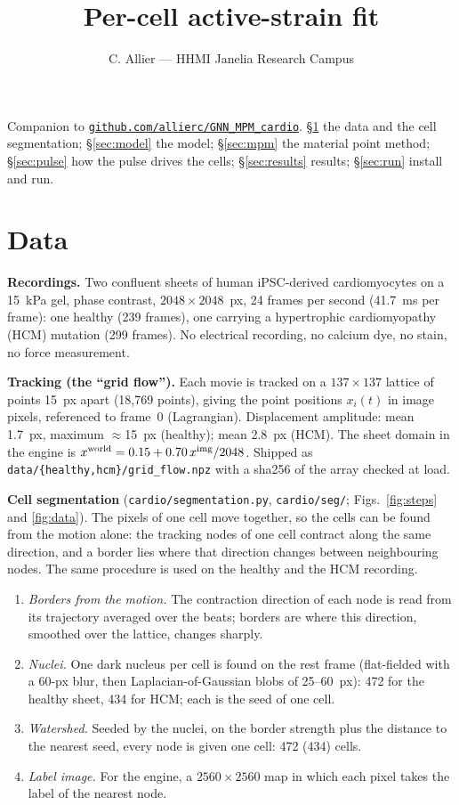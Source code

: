 \documentclass[10pt]{article}
\title{\textbf{Per-cell active-strain fit}}
\author{C. Allier --- HHMI Janelia Research Campus}
\date{}
\newcommand{\code}[1]{\texttt{#1}}
\begin{document}
\maketitle

\noindent Companion to \href{https://github.com/allierc/GNN_MPM_cardio}{\code{github.com/allierc/GNN\_MPM\_cardio}}.
\S\ref{sec:data} the data and the cell segmentation; \S\ref{sec:model} the model; \S\ref{sec:mpm} the material
point method; \S\ref{sec:pulse} how the pulse drives the cells; \S\ref{sec:results} results; \S\ref{sec:run} install and run.

\section{Data}\label{sec:data}

\textbf{Recordings.} Two confluent sheets of human iPSC-derived cardiomyocytes on a 15~kPa gel,
phase contrast, $2048\times2048$~px, 24 frames per second (41.7~ms per frame): one healthy
(239 frames), one carrying a hypertrophic cardiomyopathy (HCM) mutation (299 frames). No electrical recording, no calcium dye, no stain, no force
measurement.


\textbf{Tracking (the ``grid flow'').} Each movie is tracked on a $137\times137$ lattice of points
15~px apart (18,769 points), giving the point positions $x_i(t)$ in image pixels, referenced to frame~0
(Lagrangian). Displacement amplitude: mean 1.7~px, maximum $\approx$15~px (healthy); mean 2.8~px (HCM).
The sheet domain in the engine is $x^{\rm world} = 0.15 + 0.70\,x^{\rm img}/2048$. Shipped as
\code{data/\{healthy,hcm\}/grid\_flow.npz} with a sha256 of the array checked at load.

\textbf{Cell segmentation} (\code{cardio/segmentation.py}, \code{cardio/seg/}; Figs.~\ref{fig:steps} and \ref{fig:data}). The pixels of one
cell move together, so the cells can be found from the motion alone: the tracking nodes of one cell contract along the
same direction, and a border lies where that direction changes between neighbouring nodes. The same procedure is
used on the healthy and the HCM recording.
\begin{enumerate}[leftmargin=1.6em,itemsep=1pt]
\item \emph{Borders from the motion.} The contraction direction of each node is read from its trajectory averaged
over the beats; borders are where this direction, smoothed over the lattice, changes sharply.
\item \emph{Nuclei.} One dark nucleus per cell is found on the rest frame (flat-fielded with a 60-px blur, then
Laplacian-of-Gaussian blobs of 25--60~px): 472 for the healthy sheet, 434 for HCM; each is the seed of one cell.
\item \emph{Watershed.} Seeded by the nuclei, on the border strength plus the distance to the nearest seed, every
node is given one cell: 472 (434) cells.
\item \emph{Label image.} For the engine, a $2560\times2560$ map in which each pixel takes the label of the nearest
node.
\end{enumerate}
\end{document}
